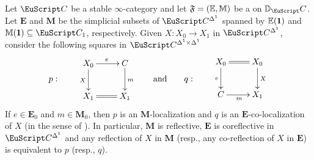 \begin{lemma}\label{lemma_infinity_orth}
Let $\iC$ be a stable $\infty$-category and let $\mathfrak{F}=(\mathbb E,\mathbb M)$ be a \dfs on $\D_\iC$. Let $\mathbf{E}$ and $\mathbf M$ be the simplicial subsets of $\iC^{\Delta^1}$ spanned by $\mathbb E(\uno)$ and $\mathbb M(\uno)\subseteq \iC_1$, respectively. Given $X\colon X_0\to X_1$ in $\iC^{\Delta^1}$, consider the following squares in $\iC^{\Delta^1\times \Delta^1}$
\[
p:\qquad\begin{matrix}\xymatrix{
X_0\ar[r]^e\ar[d]_X&C\ar[d]^m\\
X_1\ar@{=}[r]&X_1
}\end{matrix}
\qquad
\text{and}
\qquad
q:\qquad\begin{matrix}\xymatrix{
X_0\ar@{=}[r]\ar[d]_e&X_0\ar[d]^X\\
C\ar[r]_{m}&X_1
}\end{matrix}
\]
If $e\in \mathbf E_0$ and $m\in \mathbf M_0$, then $p$ is an $\mathbf M$-localization and $q$ is an $\mathbf E$-co-localization of $X$ (in the sense of \cite[\adef\textbf{5.2.7.6}]{HTT}). In particular, $\mathbf M$ is reflective, $\mathbf E$ is coreflective in $\iC^{\Delta^1}$ and any reflection of $X$ in $\mathbf M$ (resp., any co-reflection of $X$ in $\mathbf E$) is equivalent to $p$ (resp., $q$).
\end{lemma}
